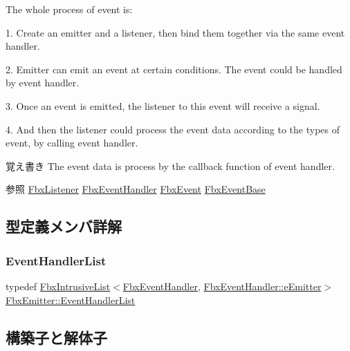 \begin{DoxyItemize}
\begin{DoxyParagraph}{The whole process of event is\+:}
\end{DoxyParagraph}
\item 1. Create an emitter and a listener, then bind them together via the same event handler. \item 2. Emitter can emit an event at certain conditions. The event could be handled by event handler. \item 3. Once an event is emitted, the listener to this event will receive a signal. \item 4. And then the listener could process the event data according to the types of event, by calling event handler. \begin{DoxyNote}{覚え書き}
The event data is process by the callback function of event handler.
\end{DoxyNote}
\begin{DoxySeeAlso}{参照}
\hyperlink{class_fbx_listener}{Fbx\+Listener} \hyperlink{class_fbx_event_handler}{Fbx\+Event\+Handler} \hyperlink{class_fbx_event}{Fbx\+Event} \hyperlink{class_fbx_event_base}{Fbx\+Event\+Base} 
\end{DoxySeeAlso}
\end{DoxyItemize}


\subsection{型定義メンバ詳解}
\mbox{\label{class_fbx_emitter_a9ac3cddf1a246e71957e4b7db6c08fc1}} 
\subsubsection{\texorpdfstring{Event\+Handler\+List}{EventHandlerList}}
{\footnotesize\ttfamily typedef \hyperlink{class_fbx_intrusive_list}{Fbx\+Intrusive\+List}$<$\hyperlink{class_fbx_event_handler}{Fbx\+Event\+Handler}, \hyperlink{class_fbx_event_handler_a47139da2cfd5abee91664d75c4fb577cae2c0d7da494cef8d787ee3495e24a6c0}{Fbx\+Event\+Handler\+::e\+Emitter}$>$ \hyperlink{class_fbx_emitter_a9ac3cddf1a246e71957e4b7db6c08fc1}{Fbx\+Emitter\+::\+Event\+Handler\+List}\hspace{0.3cm}{\ttfamily [protected]}}



\subsection{構築子と解体子}
\mbox{\label{class_fbx_emitter_a33a5aeaa15dd8c9fa66a97b3ab5db550}} 

